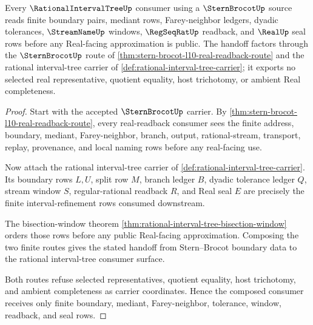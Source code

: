 \begin{theorem}
\label{thm:stern-brocot-rational-interval-tree-consumer}
Every $\RationalIntervalTreeUp$ consumer using a $\SternBrocotUp$ source reads finite boundary pairs, mediant rows, Farey-neighbor ledgers, dyadic tolerances, $\StreamNameUp$ windows, $\RegSeqRatUp$ readback, and $\RealUp$ seal rows before any Real-facing approximation is public. The handoff factors through the $\SternBrocotUp$ route of \autoref{thm:stern-brocot-l10-real-readback-route} and the rational interval-tree carrier of \autoref{def:rational-interval-tree-carrier}; it exports no selected real representative, quotient equality, host trichotomy, or ambient Real completeness.
\end{theorem}
\begin{proof}
Start with the accepted $\SternBrocotUp$ carrier. By \autoref{thm:stern-brocot-l10-real-readback-route}, every real-readback consumer sees the finite address, boundary, mediant, Farey-neighbor, branch, output, rational-stream, transport, replay, provenance, and local naming rows before any real-facing use.

Now attach the rational interval-tree carrier of \autoref{def:rational-interval-tree-carrier}. Its boundary rows $L,U$, split row $M$, branch ledger $B$, dyadic tolerance ledger $Q$, stream window $S$, regular-rational readback $R$, and Real seal $E$ are precisely the finite interval-refinement rows consumed downstream.

The bisection-window theorem \autoref{thm:rational-interval-tree-bisection-window} orders those rows before any public Real-facing approximation. Composing the two finite routes gives the stated handoff from Stern--Brocot boundary data to the rational interval-tree consumer surface.

Both routes refuse selected representatives, quotient equality, host trichotomy, and ambient completeness as carrier coordinates. Hence the composed consumer receives only finite boundary, mediant, Farey-neighbor, tolerance, window, readback, and seal rows.
\end{proof}


